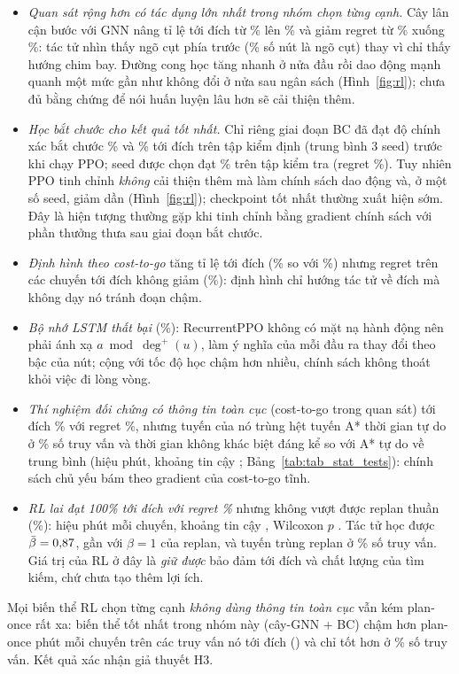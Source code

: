 \begin{itemize}
    \item \emph{Quan sát rộng hơn có tác dụng lớn nhất trong nhóm chọn từng cạnh.} Cây lân cận \TreeDepth{} bước với GNN nâng
    tỉ lệ tới đích từ \RlSuccess\% lên \RlTreeSuccess\% và giảm regret từ \RlRegret\% xuống \RlTreeRegret\%: tác tử nhìn thấy ngõ
    cụt phía trước (\DeadEndPct\% số nút là ngõ cụt) thay vì chỉ thấy hướng chim bay. Đường cong học tăng nhanh ở nửa đầu
    rồi dao động mạnh quanh một mức gần như không đổi ở nửa sau ngân sách (Hình~\ref{fig:rl}); chưa đủ bằng chứng để nói
    huấn luyện lâu hơn sẽ cải thiện thêm.
    \item \emph{Học bắt chước cho kết quả tốt nhất.} Chỉ riêng giai đoạn BC đã đạt độ chính xác bắt chước \RlTreeBcBcAcc\% và
    \RlTreeBcAfterBc\% tới đích trên tập kiểm định (trung bình 3 seed) trước khi chạy PPO; seed được chọn đạt \RlTreeBcSuccess\%
    trên tập kiểm tra (regret \RlTreeBcRegret\%). Tuy nhiên PPO tinh chỉnh \emph{không} cải thiện thêm mà làm chính sách dao động
    và, ở một số seed, giảm dần (Hình~\ref{fig:rl}); checkpoint tốt nhất thường xuất hiện sớm. Đây là hiện tượng thường gặp khi tinh chỉnh bằng
    gradient chính sách với phần thưởng thưa sau giai đoạn bắt chước.
    \item \emph{Định hình theo cost-to-go} tăng tỉ lệ tới đích (\RlShapeSuccess\% so với \RlSuccess\%) nhưng regret trên các
    chuyến tới đích không giảm (\RlShapeRegret\%): định hình chỉ hướng tác tử về đích mà không dạy nó tránh đoạn chậm.
    \item \emph{Bộ nhớ LSTM thất bại} (\RlLstmSuccess\%): RecurrentPPO không có mặt nạ hành động nên phải ánh xạ $a\bmod\deg^+(u)$,
    làm ý nghĩa của mỗi đầu ra thay đổi theo bậc của nút; cộng với tốc độ học chậm hơn nhiều, chính sách không thoát khỏi việc
    đi lòng vòng.
    \item \emph{Thí nghiệm đối chứng có thông tin toàn cục} (cost-to-go trong quan sát) tới đích \RlcSuccess\% với regret
    \RlcRegret\%, nhưng tuyến của nó trùng hệt tuyến A* thời gian tự do ở \RouteSameRlcFf\% số truy vấn và thời gian không khác
    biệt đáng kể so với A* tự do về trung bình (hiệu \DiffRlCtgFreeflow{} phút, khoảng tin cậy \CiRlCtgFreeflow;
    Bảng~\ref{tab:tab_stat_tests}): chính sách chủ yếu bám theo gradient của cost-to-go tĩnh.
    \item \emph{RL lai đạt 100\% tới đích với regret \RlHybRegret\%} nhưng không vượt được replan thuần (\RpRegret\%): hiệu
    \DiffRlHybridReplan{} phút mỗi chuyến, khoảng tin cậy \CiRlHybridReplan, Wilcoxon $p$ \PRlHybridReplan. Tác tử học được
    $\bar\beta=0{,}87$, gần với $\beta=1$ của replan, và tuyến trùng replan ở \RouteSameRlHybRp\% số truy vấn. Giá trị của RL
    ở đây là \emph{giữ được} bảo đảm tới đích và chất lượng của tìm kiếm, chứ chưa tạo thêm lợi ích.
\end{itemize}
Mọi biến thể RL chọn từng cạnh \emph{không dùng thông tin toàn cục} vẫn kém plan-once rất xa: biến thể tốt nhất trong nhóm
này (cây-GNN + BC) chậm hơn plan-once
\DiffRlTreeBcPlanOnce{} phút mỗi chuyến trên các truy vấn nó tới đích (\CiRlTreeBcPlanOnce) và chỉ tốt hơn ở
\BetterRlTreeBcPlanOnce\% số truy vấn. Kết quả xác nhận giả thuyết H3.

